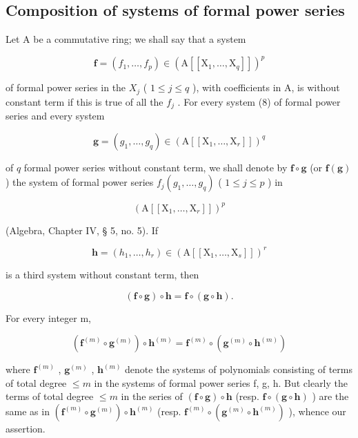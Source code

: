\subsection{Composition of systems of formal power series}

Let A be a commutative ring; we shall say that a system

\[
\mathbf {f} = (f _ {1}, \dots , f _ {p}) \in (\mathrm{A} [ [ \mathrm{X} _ {1}, \dots , \mathrm{X} _ {q} ] ]) ^ {p}\tag{8}
\]

of formal power series in the \(X_{j}\) ( \(1 \leqslant j \leqslant q\) ), with coefficients in A, is without constant term if this is true of all the \(f_{j}\) . For every system (8) of formal power series and every system

\[
\mathbf {g} = (g _ {1}, \dots , g _ {q}) \in (\mathrm{A} [ [ \mathrm{X} _ {1}, \dots , \mathrm{X} _ {r} ] ]) ^ {q}\tag{9}
\]

of \(q\) formal power series without constant term, we shall denote by \(\mathbf{f} \circ \mathbf{g}\) (or \(\mathbf{f}(\mathbf{g})\) ) the system of formal power series \(f_{j}(g_{1},\ldots ,g_{q})\) ( \(1\leqslant j\leqslant p\) ) in

\[
\left. \left(\mathrm{A} \left[ \left[ \mathrm{X} _ {1}, \dots , \mathrm{X} _ {r} \right] \right]\right) ^ {p} \right.
\]

(Algebra, Chapter IV, § 5, no. 5). If

\[
\mathbf {h} = (h _ {1}, \dots , h _ {r}) \in (\mathrm{A} [ [ \mathrm{X} _ {1}, \dots , \mathrm{X} _ {s} ] ]) ^ {r}
\]

is a third system without constant term, then

\[
(\mathbf {f} \circ \mathbf {g}) \circ \mathbf {h} = \mathbf {f} \circ (\mathbf {g} \circ \mathbf {h}).\tag{10}
\]

For every integer m,

\[
\left(\mathbf {f} ^ {(m)} \circ \mathbf {g} ^ {(m)}\right) \circ \mathbf {h} ^ {(m)} = \mathbf {f} ^ {(m)} \circ \left(\mathbf {g} ^ {(m)} \circ \mathbf {h} ^ {(m)}\right)
\]

where \(\mathbf{f}^{(m)}\) , \(\mathbf{g}^{(m)}\) , \(\mathbf{h}^{(m)}\) denote the systems of polynomials consisting of terms of total degree \(\leqslant m\) in the systems of formal power series f, g, h. But clearly the terms of total degree \(\leqslant m\) in the series of \((\mathbf{f} \circ \mathbf{g}) \circ \mathbf{h}\) (resp. \(\mathbf{f} \circ (\mathbf{g} \circ \mathbf{h})\) ) are the same as in \((\mathbf{f}^{(m)} \circ \mathbf{g}^{(m)}) \circ \mathbf{h}^{(m)}\) (resp. \(\mathbf{f}^{(m)} \circ (\mathbf{g}^{(m)} \circ \mathbf{h}^{(m)})\) ), whence our assertion.

